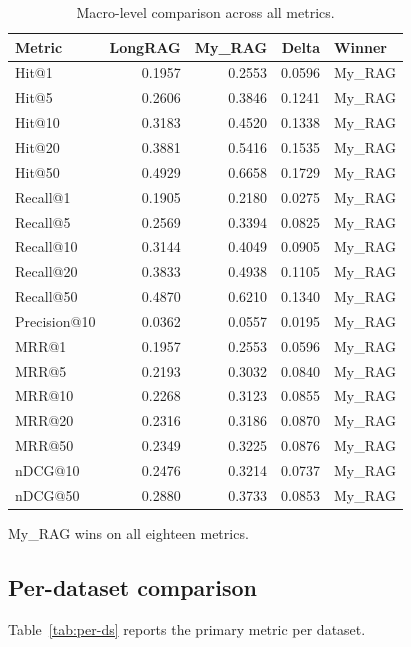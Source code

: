 \documentclass[11pt,a4paper]{article}
\begin{document}
\begin{table}[h]
\centering
\caption{Macro-level comparison across all metrics.}
\label{tab:macro}
\small
\begin{tabular}{l r r r l}
\toprule
\textbf{Metric} & \textbf{LongRAG} & \textbf{My\_RAG}
  & \textbf{Delta} & \textbf{Winner} \\
\midrule
Hit@1     & \num{0.1957} & \num{0.2553} & \num{+0.0596} & My\_RAG \\
Hit@5     & \num{0.2606} & \num{0.3846} & \num{+0.1241} & My\_RAG \\
Hit@10    & \num{0.3183} & \num{0.4520} & \num{+0.1338} & My\_RAG \\
Hit@20    & \num{0.3881} & \num{0.5416} & \num{+0.1535} & My\_RAG \\
Hit@50    & \num{0.4929} & \num{0.6658} & \num{+0.1729} & My\_RAG \\
Recall@1  & \num{0.1905} & \num{0.2180} & \num{+0.0275} & My\_RAG \\
Recall@5  & \num{0.2569} & \num{0.3394} & \num{+0.0825} & My\_RAG \\
Recall@10 & \num{0.3144} & \num{0.4049} & \num{+0.0905} & My\_RAG \\
Recall@20 & \num{0.3833} & \num{0.4938} & \num{+0.1105} & My\_RAG \\
Recall@50 & \num{0.4870} & \num{0.6210} & \num{+0.1340} & My\_RAG \\
Precision@10 & \num{0.0362} & \num{0.0557} & \num{+0.0195} & My\_RAG \\
MRR@1     & \num{0.1957} & \num{0.2553} & \num{+0.0596} & My\_RAG \\
MRR@5     & \num{0.2193} & \num{0.3032} & \num{+0.0840} & My\_RAG \\
MRR@10    & \num{0.2268} & \num{0.3123} & \num{+0.0855} & My\_RAG \\
MRR@20    & \num{0.2316} & \num{0.3186} & \num{+0.0870} & My\_RAG \\
MRR@50    & \num{0.2349} & \num{0.3225} & \num{+0.0876} & My\_RAG \\
nDCG@10   & \num{0.2476} & \num{0.3214} & \num{+0.0737} & My\_RAG \\
nDCG@50   & \num{0.2880} & \num{0.3733} & \num{+0.0853} & My\_RAG \\
\bottomrule
\end{tabular}
\end{table}

My\_RAG wins on all eighteen metrics.

\subsection{Per-dataset comparison}
Table~\ref{tab:per-ds} reports the primary metric per dataset.
\end{document}
